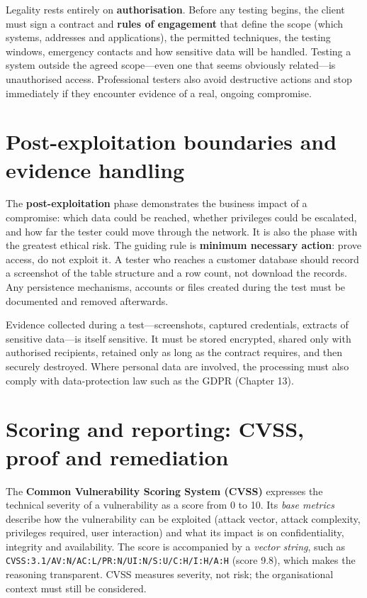 \documentclass[11pt,openany]{book}
\begin{document}
Legality rests entirely on \textbf{authorisation}. Before any testing begins, the client must sign a contract and \textbf{rules of engagement} that define the scope (which systems, addresses and applications), the permitted techniques, the testing windows, emergency contacts and how sensitive data will be handled. Testing a system outside the agreed scope—even one that seems obviously related—is unauthorised access. Professional testers also avoid destructive actions and stop immediately if they encounter evidence of a real, ongoing compromise.

\section{Post-exploitation boundaries and evidence handling}\label{sec:10.5}
The \textbf{post-exploitation} phase demonstrates the business impact of a compromise: which data could be reached, whether privileges could be escalated, and how far the tester could move through the network. It is also the phase with the greatest ethical risk. The guiding rule is \textbf{minimum necessary action}: prove access, do not exploit it. A tester who reaches a customer database should record a screenshot of the table structure and a row count, not download the records. Any persistence mechanisms, accounts or files created during the test must be documented and removed afterwards.

Evidence collected during a test—screenshots, captured credentials, extracts of sensitive data—is itself sensitive. It must be stored encrypted, shared only with authorised recipients, retained only as long as the contract requires, and then securely destroyed. Where personal data are involved, the processing must also comply with data-protection law such as the GDPR (Chapter 13).

\section{Scoring and reporting: CVSS, proof and remediation}\label{sec:10.6}
The \textbf{Common Vulnerability Scoring System (CVSS)} expresses the technical severity of a vulnerability as a score from 0 to 10. Its \emph{base metrics} describe how the vulnerability can be exploited (attack vector, attack complexity, privileges required, user interaction) and what its impact is on confidentiality, integrity and availability. The score is accompanied by a \emph{vector string}, such as \texttt{CVSS:3.1/AV:N/AC:L/PR:N/UI:N/S:U/C:H/I:H/A:H} (score 9.8), which makes the reasoning transparent. CVSS measures severity, not risk; the organisational context must still be considered.
\end{document}
